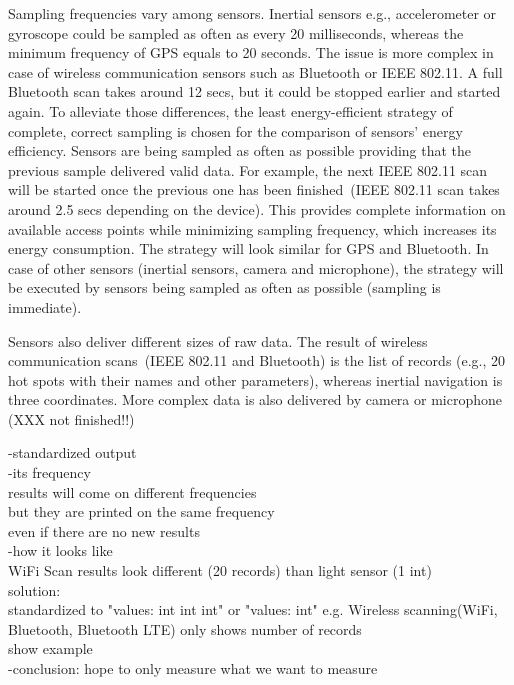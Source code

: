 Sampling frequencies vary among sensors. Inertial sensors e.g., accelerometer or gyroscope could be sampled as often as every 20 milliseconds, whereas the minimum frequency of GPS equals to 20 seconds. The issue is more complex in case of wireless communication sensors such as Bluetooth or IEEE 802.11. A full Bluetooth scan takes around 12 secs, but it could be stopped earlier and started again. To alleviate those differences, the least energy-efficient strategy of complete, correct sampling is chosen for the comparison of sensors' energy efficiency. Sensors are being sampled as often as possible providing that the previous sample delivered valid data. For example, the next IEEE 802.11 scan will be started once the previous one has been finished\ (IEEE 802.11 scan takes around 2.5 secs depending on the device). This provides complete information on available access points while minimizing sampling frequency, which increases its energy consumption. The strategy will look similar for GPS and Bluetooth. In case of other sensors (inertial sensors, camera and microphone), the strategy will be executed by sensors being sampled as often as possible (sampling is immediate). 


Sensors also deliver different sizes of raw data. The result of wireless communication scans\ (IEEE 802.11 and Bluetooth) is the list of records (e.g., 20 hot spots with their names and other parameters), whereas inertial navigation is three coordinates. More complex data is also delivered by camera or microphone (XXX not finished!!)
					
		-standardized output\\
				-its frequency\\
					results will come on different frequencies\\
					but they are printed on the same frequency\\
						even if there are no new results\\
				-how it looks like\\
					WiFi Scan results look different (20 records) than light sensor (1 int)\\
					solution:\\
						standardized to "values: int int int" or "values: int"
							e.g. Wireless scanning(WiFi, Bluetooth, Bluetooth LTE) only shows number of records\\
							show example\\	
		-conclusion: hope to only measure what we want to measure\\				
				
